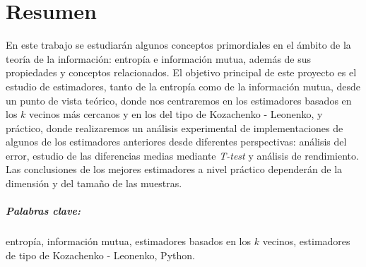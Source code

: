\chapter*{Resumen}

En este trabajo se estudiarán algunos conceptos primordiales en el ámbito de la teoría de la información: entropía e información mutua, además de sus propiedades y conceptos relacionados. El objetivo principal de este proyecto es el estudio de estimadores, tanto de la entropía como de la información mutua, desde un punto de vista teórico, donde nos centraremos en los estimadores basados en los $k$ vecinos más cercanos y en los del tipo de Kozachenko - Leonenko, y práctico, donde realizaremos un análisis experimental de implementaciones de algunos de los estimadores anteriores desde diferentes perspectivas: análisis del error, estudio de las diferencias medias mediante \textit{T-test} y análisis de rendimiento. Las conclusiones de los mejores estimadores a nivel práctico dependerán de la dimensión y del tamaño de las muestras.\\

\paragraph{Palabras clave:} entropía, información mutua, estimadores basados en los $k$ vecinos, estimadores de tipo de Kozachenko - Leonenko, Python.
